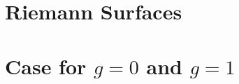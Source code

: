 \documentclass[a4paper, 8pt, notitlepage]{extreport}
\begin{document}
    

    \chapter{Riemann Surfaces}
    
    
    

    \chapter{Case for $g=0$ and $g=1$}
    
    
    \printbibliography
\end{document}
